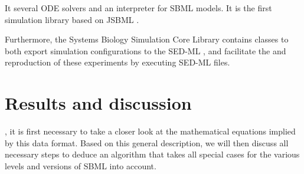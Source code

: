 \documentclass[10pt]{bmc_article}
\newenvironment{bmcformat}{\fussy\setboolean{publ}{true}}{\fussy}
\begin{document}
\begin{bmcformat}
%
%
%
%
It  several \acf{ODE} solvers and an interpreter for \acs{SBML}
models.
It is the first simulation library based on JSBML \cite{Draeger2011b}. 
%

Furthermore, the Systems Biology Simulation Core Library contains classes to both export
simulation configurations to the \acf{SED-ML} \cite{Waltemath2011},
and facilitate the  and reproduction of these experiments by executing \acs{SED-ML} files.

\section*{Results and discussion}

,
it is first necessary to take a closer look at the mathematical equations implied by this data format.
Based on this general description, we will then discuss all necessary steps
to deduce an algorithm that takes all special cases for the various levels and
versions of \acs{SBML} into account.


\end{bmcformat}
\end{document}
